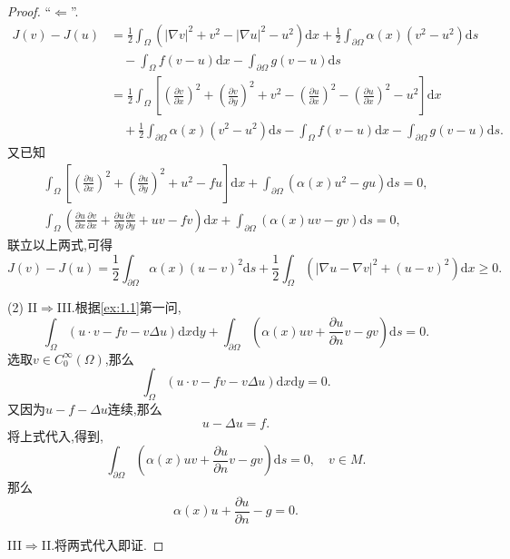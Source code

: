 \documentclass[a4paper,oneside,12pt]{ctexart}
\theoremstyle{plain}
\theoremstyle{nonumberplain}
\theoremstyle{nonumberplain}
\newtheorem{proof}{证明.}
\newcommand{\dif}{\mathrm{d}}
\newcommand{\ptl}{\partial}
\newcommand{\abs}[1]{\left\vert#1\right\vert}
\begin{document}
\begin{proof}
        ``$\Leftarrow$''.
        \begin{align*}
            J(v)-J(u)&=\frac{1}{2}\int_\Omega (\abs{\nabla v}^2+v^2-\abs{\nabla u}^2-u^2)\dif x+\frac{1}{2}\int_{\ptl \Omega}\alpha(x)(v^2-u^2)\dif s\\
            &\quad -\int_\Omega f(v-u)\dif x-\int_{\ptl \Omega}g(v-u)\dif s\\
            &=\frac{1}{2}\int_\Omega\left[\left(\frac{\ptl v}{\ptl x}\right)^2+\left(\frac{\ptl v}{\ptl y}\right)^2+v^2-\left(\frac{\ptl u}{\ptl x}\right)^2-\left(\frac{\ptl u}{\ptl x}\right)^2-u^2\right]\dif x\\
            &\quad +\frac{1}{2}\int_{\ptl \Omega}\alpha(x)(v^2-u^2)\dif s-\int_\Omega f(v-u)\dif x-\int_{\ptl \Omega}g(v-u)\dif s.
         \end{align*}
         又已知
         \begin{gather*}
            \int_\Omega\left[\left(\frac{\ptl u}{\ptl x}\right)^2+\left(\frac{\ptl u}{\ptl y}\right)^2+u^2-fu\right]\dif x+\int_{\ptl\Omega}(\alpha(x)u^2-gu)\dif s=0,\\
            \int_\Omega\left(\frac{\ptl u}{\ptl x}\frac{\ptl v}{\ptl x}+\frac{\ptl u}{\ptl y}\frac{\ptl v}{\ptl y}+uv-fv\right)\dif x+\int_{\ptl\Omega}(\alpha(x)uv-gv)\dif s=0,
         \end{gather*}
         联立以上两式,可得
         \begin{equation*}
            J(v)-J(u)=\frac{1}{2}\int_{\ptl\Omega}\alpha(x)(u-v)^2\dif s+\frac{1}{2}\int_\Omega(\abs{\nabla u-\nabla v}^2+(u-v)^2)\dif x\geqslant 0.
         \end{equation*}

        (2) II$\Rightarrow$III.根据\cref{ex:1.1}第一问,
        \begin{equation*}
            \int_\Omega (u\cdot v-fv-v\Delta u)\dif x\dif y+\int_{\ptl\Omega}(\alpha(x)uv+\frac{\ptl u}{\ptl n}v-gv)\dif s=0.
        \end{equation*}
        选取$v\in C_0^\infty(\Omega)$,那么 
        \begin{equation*}
            \int_\Omega(u\cdot v-fv-v\Delta u)\dif x\dif y=0.
        \end{equation*}
        又因为$u-f-\Delta u$连续,那么 
        \begin{equation*}
            u-\Delta u=f.
        \end{equation*}
        将上式代入,得到,
        \begin{equation*}
            \int_{\ptl\Omega}(\alpha(x)uv+\frac{\ptl u}{\ptl n}v-gv)\dif s=0,\quad v\in M.
        \end{equation*}
        那么 
        \begin{equation*}
            \alpha(x)u+\frac{\ptl u}{\ptl n}-g=0.
        \end{equation*}
        
        III$\Rightarrow$II.将两式代入即证.
    \end{proof}
\end{document}
